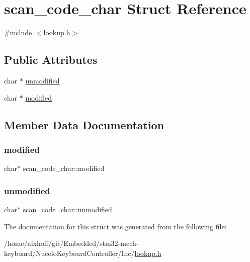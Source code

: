 \hypertarget{structscan__code__char}{}\section{scan\+\_\+code\+\_\+char Struct Reference}
\label{structscan__code__char}


{\ttfamily \#include $<$lookup.\+h$>$}

\subsection*{Public Attributes}
\begin{DoxyCompactItemize}
\item 
char $\ast$ \hyperlink{structscan__code__char_afbd9f6c07539714f26a0578d1f400deb}{unmodified}
\item 
char $\ast$ \hyperlink{structscan__code__char_a93a3962ac623dfbff301f0ee89424a48}{modified}
\end{DoxyCompactItemize}


\subsection{Member Data Documentation}
\mbox{\label{structscan__code__char_a93a3962ac623dfbff301f0ee89424a48}} 
\subsubsection{\texorpdfstring{modified}{modified}}
{\footnotesize\ttfamily char$\ast$ scan\+\_\+code\+\_\+char\+::modified}

\mbox{\label{structscan__code__char_afbd9f6c07539714f26a0578d1f400deb}} 
\subsubsection{\texorpdfstring{unmodified}{unmodified}}
{\footnotesize\ttfamily char$\ast$ scan\+\_\+code\+\_\+char\+::unmodified}



The documentation for this struct was generated from the following file\+:\begin{DoxyCompactItemize}
\item 
/home/alxhoff/git/\+Embedded/stm32-\/mech-\/keyboard/\+Nucelo\+Keyboard\+Controller/\+Inc/\hyperlink{lookup_8h}{lookup.\+h}\end{DoxyCompactItemize}
